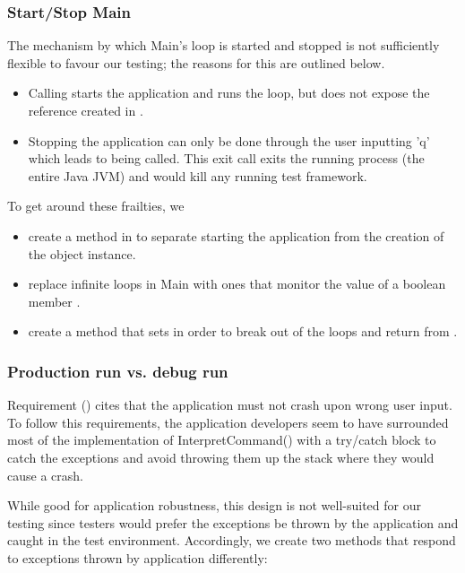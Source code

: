 \subsubsection{Start/Stop Main}
\label{sec:start-stop-main}
The mechanism by which Main's loop is started and stopped is not sufficiently flexible to favour our testing; the reasons for this are outlined below.
\begin{itemize}
	\item Calling  starts the application and runs the loop, but does not expose the  reference created in . 
	\item Stopping the application can only be done through the user inputting 'q' which leads to  being called. This exit call exits the running process (the entire Java JVM) and would kill any running test framework.
\end{itemize}

To get around these frailties, we
\begin{itemize}
	\item create a method  in  to separate starting the application from the creation of the  object instance. 
	\item replace infinite loops in Main with ones that monitor the value of a boolean member . 
	\item create a method  that sets  in order to break out of the loops and return from .
\end{itemize}

\subsubsection{Production run vs. debug run}
\label{sec:production-vs-debug}
Requirement (\RSeven) cites that the application must not crash upon wrong user input. To follow this requirements, the application developers seem to have surrounded most of the implementation of InterpretCommand() with a try/catch block to catch the exceptions and avoid throwing them up the stack where they would cause a crash.
\par 
While good for application robustness, this design is not well-suited for our testing since testers would prefer the exceptions be thrown by the application and caught in the test environment. Accordingly, we create two  methods that respond to exceptions thrown by application differently: 

